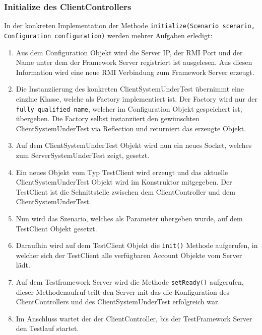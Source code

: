 \subsubsection{Initialize des ClientControllers}
In der konkreten Im\-p\-le\-men\-ta\-ti\-on der Me\-tho\-de \texttt{initialize(Scenario sce\allowbreak na\allowbreak rio, Configuration configuration)} werden mehrer Auf\-gaben er\-le\-digt:
\begin{enumerate}
\item Aus dem Configuration Objekt wird die Server IP, der RMI Port und der Name unter dem der Framework Server registriert ist ausgelesen. Aus diesen Information wird eine neue RMI Verbindung zum Framework Server erzeugt.
\item Die Instanziierung des konkreten ClientSystemUnderTest übernimmt eine einzlne Klasse, welche als Factory implementiert ist. Der Factory wird nur der \verb+fully qualified name+, welcher im Configuration Objekt gespeichert ist, übergeben. Die Factory selbst instanziiert den ge\-wünschten Client\-System\-Under\-Test via Re\-flec\-ti\-on und re\-turniert das erzeugte Objekt.
\item Auf dem ClientSystemUnderTest Objekt wird nun ein neues Socket, welches zum ServerSystemUnderTest zeigt, gesetzt.
\item Ein neues Objekt vom Typ TestClient wird erzeugt und das aktuelle ClientSystemUnderTest Objekt wird im Konstruktor mitgegeben. Der TestClient ist die Schnittstelle zwischen dem ClientController und dem ClientSystemUnderTest.
\item Nun wird das Szenario, welches als Parameter übergeben wurde, auf dem TestClient Objekt gesetzt. 
\item Daraufhin wird auf dem Test\-Client Objekt die \verb+init()+ Methode auf\-ge\-rufen, in welcher sich der TestClient alle verfügbaren Account Objekte vom Server lädt.
\item Auf dem Testframework Server wird die Me\-tho\-de \verb+setReady()+ auf\-ge\-rufen, dieser Methoden\-aufruf teilt den Server mit das die Konfiguration des ClientControllers und des ClientSystemUnderTest erfolgreich war.
\item Im Anschluss wartet der der ClientController, bis der TestFramework Server den Testlauf startet.
\end{enumerate}

